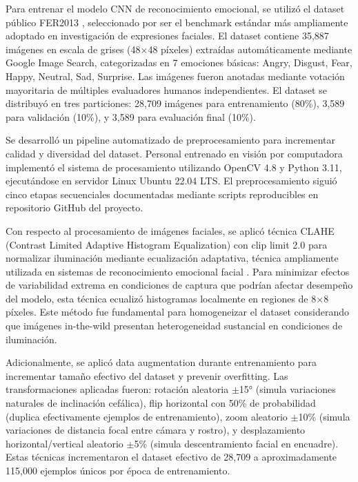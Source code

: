 \documentclass[journal,article,submit,pdftex,moreauthors]{Definitions/mdpi}
\begin{document}
	Para entrenar el modelo CNN de reconocimiento emocional, se utilizó el dataset público FER2013 \cite{ref16,ref17}, seleccionado por ser el benchmark estándar más ampliamente adoptado en investigación de expresiones faciales. El dataset contiene 35,887 imágenes en escala de grises (48$\times$48 píxeles) extraídas automáticamente mediante Google Image Search, categorizadas en 7 emociones básicas: Angry, Disgust, Fear, Happy, Neutral, Sad, Surprise. Las imágenes fueron anotadas mediante votación mayoritaria de múltiples evaluadores humanos independientes. El dataset se distribuyó en tres particiones: 28,709 imágenes para entrenamiento (80\%), 3,589 para validación (10\%), y 3,589 para evaluación final (10\%).
	
	Se desarrolló un pipeline automatizado de preprocesamiento para incrementar calidad y diversidad del dataset. Personal entrenado en visión por computadora implementó el sistema de procesamiento utilizando OpenCV 4.8 y Python 3.11, ejecutándose en servidor Linux Ubuntu 22.04 LTS. El preprocesamiento siguió cinco etapas secuenciales documentadas mediante scripts reproducibles en repositorio GitHub del proyecto.
	
	Con respecto al procesamiento de imágenes faciales, se aplicó técnica CLAHE (Contrast Limited Adaptive Histogram Equalization) con clip limit 2.0 para normalizar iluminación mediante ecualización adaptativa, técnica ampliamente utilizada en sistemas de reconocimiento emocional facial \cite{ref34,ref35}. Para minimizar efectos de variabilidad extrema en condiciones de captura que podrían afectar desempeño del modelo, esta técnica ecualizó histogramas localmente en regiones de 8$\times$8 píxeles. Este método fue fundamental para homogeneizar el dataset considerando que imágenes in-the-wild presentan heterogeneidad sustancial en condiciones de iluminación.
	
	Adicionalmente, se aplicó data augmentation durante entrenamiento para incrementar tamaño efectivo del dataset y prevenir overfitting. Las transformaciones aplicadas fueron: rotación aleatoria $\pm$15° (simula variaciones naturales de inclinación cefálica), flip horizontal con 50\% de probabilidad (duplica efectivamente ejemplos de entrenamiento), zoom aleatorio $\pm$10\% (simula variaciones de distancia focal entre cámara y rostro), y desplazamiento horizontal/vertical aleatorio $\pm$5\% (simula descentramiento facial en encuadre). Estas técnicas incrementaron el dataset efectivo de 28,709 a aproximadamente 115,000 ejemplos únicos por época de entrenamiento.
	
\end{document}
